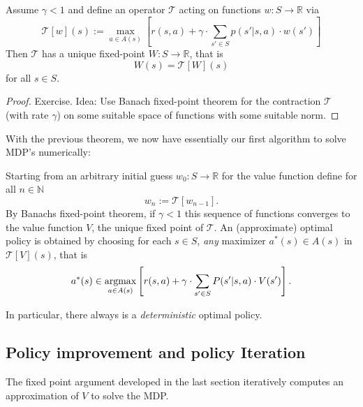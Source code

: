 \begin{theorem}
    Assume \( \gamma < 1  \) and define an operator \( \mathcal{T} \) acting on functions 
    \( w: S \to \mathbb{R} \) via 
    \[
        \mathcal{T}[w](s) := \max_{a \in A(s)}\left[ r(s,a) + \gamma \cdot \sum_{s' \in S} p(s' | s,a) \cdot w(s') \right]
    \]
    Then \( \mathcal{T} \) has a unique fixed-point \( W: S \to \mathbb{R} \), that is
    \[
        W(s) = \mathcal{T}[W](s)
    \]
    for all \( s \in S \).
\end{theorem}
\begin{proof}
    Exercise. Idea: Use Banach fixed-point theorem for the contraction \( \mathcal{T} \) (with rate \( \gamma \)) on some suitable space of functions with some suitable norm.
\end{proof}



With the previous theorem, we now have essentially our first algorithm to solve MDP's numerically:

Starting from an arbitrary initial guess \( w_{0}: S \to \mathbb{R} \) for the value function define for all \( n \in \mathbb{N} \)
\[
    w_n := \mathcal{T}[w_{n-1}].
\]
By Banachs fixed-point theorem, if \( \gamma < 1\) this sequence of functions converges to the value function \( V \), the unique fixed point of \( \mathcal{T} \).
An (approximate) optimal policy is obtained by choosing for each \( s \in S \), \textit{any} maximizer \( a^*(s) \in A(s) \) in \( \mathcal{T}[V](s) \), that is 
\[
    a^*(s) \in \operatorname*{argmax}_{a \in A(s)} \left[ r(s,a) + \gamma \cdot \sum_{s' \in S} P(s' | s,a) \cdot V(s') \right].
\]

In particular, there always is a \emph{deterministic} optimal policy.














\subsection{Policy improvement and policy Iteration}

The fixed point argument developed in the last section iteratively computes an approximation of \( V \) to solve the MDP.

